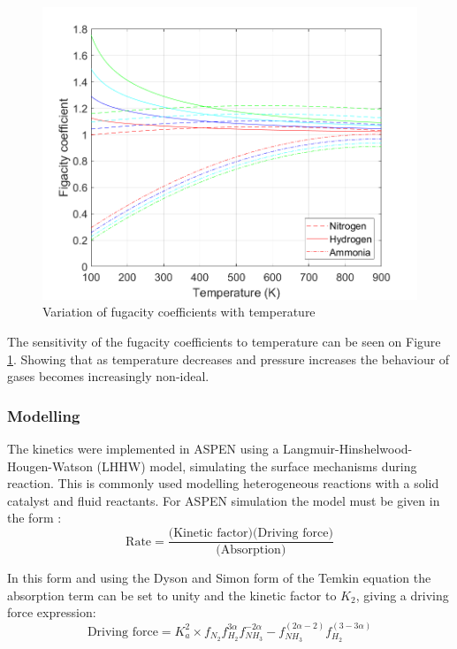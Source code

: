 \documentclass[11pt, a4paper]{article}
\begin{document}
{\begin{figure}
		\includegraphics[width=1\textwidth]{fugacity_coeff1}
		\caption{Variation of fugacity coefficients with temperature \label{fig:fugco}}
\end{figure}
The sensitivity of the fugacity coefficients to temperature can be seen on Figure \ref{fig:fugco}. Showing that as temperature decreases and pressure increases the behaviour of gases becomes increasingly non-ideal. 


\subsubsection{Modelling}
The kinetics were implemented in ASPEN using a Langmuir-Hinshelwood-Hougen-Watson (LHHW) model, simulating the surface mechanisms during reaction. This is commonly used modelling heterogeneous reactions with a solid catalyst and fluid reactants. For ASPEN simulation the model must be given in the form \cite{Plus2008}:
\begin{equation} 
\text{Rate} = \frac{\text{(Kinetic factor)(Driving force)}}{\text{(Absorption)}}
\end{equation}


In this form and using the Dyson and Simon form of the Temkin equation the absorption term can be set to unity and the kinetic factor to $K_{2}$, giving a driving force expression: 
\begin{equation} \text{Driving force} = K_a^2 \times f_{N_2}
f_{H_2}^{3\alpha}f_{NH_3}^{-2\alpha} - f_{NH_3}^{(2\alpha-2)}f_{H_2}^{(3-3\alpha)} \end{equation}

}
\end{document}
